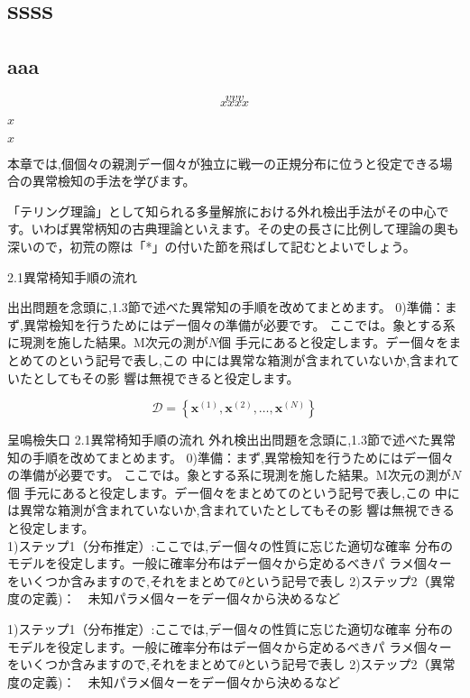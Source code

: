 \documentclass{book}
\begin{document}
\chapter{ssss}

\section{aaa}

$$vvv$$
\[
xxxx
\]



\( x \)

$x$

\centering \Huge

本章では,個個々の親測デー個々が独立に戦一の正規分布に位うと役定できる場合の異常檢知の手法を学びます。

「テリング理論」として知られる多量解旅における外れ檢出手法がその中心です。いわば異常柄知の古典理論といえます。その史の長さに比例して理論の奧も深いので，初荒の際は「*」の付いた節を飛ばして記むとよいでしょう。


2.1異常椅知手順の流れ

出出問題を念頭に,1.3節で述べた異常知の手順を改めてまとめます。
0)準備：まず,異常檢知を行うためにはデー個々の準備が必要です。
ここでは。象とする系に現測を施した結果。M次元の測が$N$個
手元にあると役定します。デー個々をまとめてのという記号で表し,この
中には異常な箱測が含まれていないか,含まれていたとしてもその影
響は無視できると役定します。

$$
\mathcal{D}=\left\{\boldsymbol{x}^{(1)},\boldsymbol{x}^{(2)},\ldots,\boldsymbol{x}^{(N)}\right\}
$$


呈鳴檢失口
2.1異常椅知手順の流れ
外れ検出出問題を念頭に,1.3節で述べた異常知の手順を改めてまとめます。
0)準備：まず,異常檢知を行うためにはデー個々の準備が必要です。
ここでは。象とする系に現測を施した結果。M次元の測が$N$個
手元にあると役定します。デー個々をまとめてのという記号で表し,この
中には異常な箱測が含まれていないか,含まれていたとしてもその影
響は無視できると役定します。
$$
$$
1)ステップ1（分布推定）:ここでは,デー個々の性質に忘じた適切な確率
分布のモデルを役定します。一般に確率分布はデー個々から定めるべきパ
ラメ個々ーをいくつか含みますので,それをまとめて$\theta$という記号で表し
2)ステップ2（異常度の定義)：$\quad$未知パラメ個々ーをデー個々から決めるなど



1)ステップ1（分布推定）:ここでは,デー個々の性質に忘じた適切な確率
分布のモデルを役定します。一般に確率分布はデー個々から定めるべきパ
ラメ個々ーをいくつか含みますので,それをまとめて$\theta$という記号で表し
2)ステップ2（異常度の定義)：$\quad$未知パラメ個々ーをデー個々から決めるなど
\end{document}
